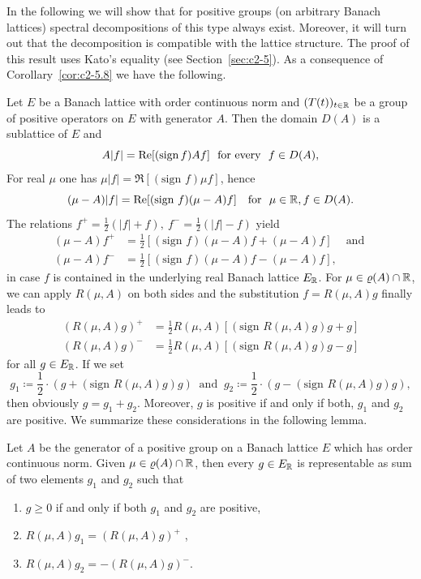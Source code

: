 In the following we will show that for positive groups (on arbitrary Banach
lattices) spectral decompositions of this type always exist. 
Moreover,
it will turn out that the decomposition is compatible with the lattice
structure. 
The proof of this result uses Kato's equality (see Section~\ref{sec:c2-5}).%
As a consequence of Corollary~\ref{cor:c2-5.8}  we have the following.

Let $E$ be a Banach lattice with order continuous norm and $(T(t))_{t \in \R }$
be a group of positive operators on $E$ with generator $A$.
Then the domain $D(A)$ is a sublattice of\/ $E$ and
\begin{equation}\label{eq:c3-4.8}
	A|f| = \Re [(\text{sign\,} f)Af] \ \text{ for every } \ f \in D(A) , 
\end{equation}
For real $\mu$ one has $\mu|f| = \Re [(\text{sign } f)\mu f]$, hence
\[
(\mu - A)|f| = \Re[(\text{sign } f)(\mu - A)f] \ \ \text{ for } \ \mu \in \R , f \in D(A) .
\]
The relations $f^+ = \frac{1}{2}(|f| + f), \ f^- = \frac{1}{2}(|f| - f)$ yield
\begin{align*}
(\mu - A)f^+ &= \frac{1}{2}[(\text{sign } f)(\mu - A)f + (\mu - A)f] \quad\ \text{and }\\
(\mu - A)f^- &= \frac{1}{2}[(\text{sign } f)(\mu - A)f - (\mu - A)f] , 
\end{align*}
in case $f$ is contained in the underlying real Banach lattice $E_{\R }$.
For $\mu \in \rho(A) \cap \R $, we can apply $R(\mu,A)$ on both sides and the substitution $f = R(\mu,A)g$ finally leads to
\begin{equation}\label{eq:c3-4.9}
	\begin{split}
	(R(\mu,A)g)^+ &= \frac{1}{2}R(\mu,A) [(\text{sign } R(\mu,A)g)g + g] \\
	(R(\mu,A)g)^- &= \frac{1}{2}R(\mu,A) [(\text{sign } R(\mu,A)g)g - g]
	\end{split}
\end{equation}
for all $g \in E_{\R }$. 
If we set
\[ 
g_1 \coloneq \frac{1}{2}\cdot(g + (\text{sign } R(\mu,A)g)g) \ \text{ and } \ 
g_2 \coloneq \frac{1}{2}\cdot(g - (\text{sign } R(\mu,A)g)g) , 
\]
then obviously $g = g_1 + g_2$. Moreover, $g$ is positive if and only if
both, $g_1$ and $g_2$ are positive. We summarize these considerations in the following lemma.
\begin{lemma}\label{lem:c3-4.6}
Let $A$ be the generator of a positive group on a Banach
lattice $E$ which has order continuous norm. Given $\mu \in \rho(A) \cap \R $, then
every $g \in E_{\R }$ is representable as sum of two elements $g_1$ and $g_2$
such that
\begin{enumerate}[\upshape (i)]
	\item 
	$g \geq 0$ if and only if both $g_1$ and $g_2$ are positive,
	
	\item
	$R(\mu,A)g_1 = (R(\mu,A)g)^+$ , 

	\item
	$R(\mu,A)g_2 = -(R(\mu,A)g)^-$. 
\end{enumerate}	
\end{lemma}
